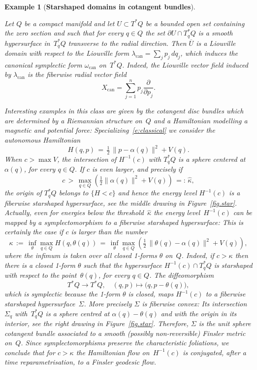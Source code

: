 \documentclass[12pt,twoside]{amsart}
\theoremstyle{plain}
\newtheorem{example}[theorem]{Example}
\numberwithin{figure}{section}
\numberwithin{equation}{section}
\def\can{\operatorname{can}}
\def\ga{\alpha}
\begin{document}
\begin{example}[\bf Starshaped domains in cotangent bundles]  \label{ex:spherisation}
{\rm 
Let $Q$ be a compact manifold and let $U \subset T^* Q$ be a bounded open set containing the zero section 
and such that for every $q \in Q$ the set $\partial U \cap T_q^* Q$ is a smooth hypersurface in~$T^*_q Q$ transverse to the radial direction. Then $\overline{U}$ is a Liouville domain with respect to the Liouville form $\lambda_{\can} = \sum_j p_j\, dq_j$, which induces the canonical symplectic 
form $\omega_{\can}$ on~$T^* Q$. 
Indeed, the Liouville vector field induced by $\lambda_{\can}$ is the fiberwise radial vector field
\[
X_{\can} = \sum_{j=1}^n p_j \frac{\partial}{\partial p_j}.
\]

Interesting examples in this class are given by the cotangent disc bundles which are determined by a Riemannian structure on~$Q$ and a Hamiltonian modelling a magnetic and potential force:
%
Specializing~\eqref{e:classical} we consider the autonomous Hamiltonian
\begin{equation} \label{e:AV}
H(q,p)  \,=\, \tfrac 12\, \| p-\ga (q) \|^2 + V(q) .
\end{equation}
When $c> \max V$, the intersection of $H^{-1}(c)$ with $T_q^*Q$ is a sphere centered 
at~$\ga (q)$, for every $q \in Q$. If $c$ is even larger, and precisely if
%
\begin{equation} \label{threshold}
c \,>\, \max_{q \in Q} \left( \tfrac 12 \| \ga (q) \|^2 + V(q)\right) \,=:\, \hat \kappa,
\end{equation}
the origin of $T_q^* Q$ belongs to $\{H<c\}$ and hence
the energy level $H^{-1}(c)$ is a fiberwise starshaped hypersurface,
see the middle drawing in Figure~\ref{fig.star}.
Actually, even for energies below the threshold~$\hat \kappa$ the energy level~$H^{-1}(c)$ can be mapped by a symplectomorphism to a 
fiberwise starshaped hypersurface: 
This is certainly the case if $c$ is larger than the number
\[
\kappa \,:=\, \inf_{\theta} \max_{q\in Q} H(q,\theta(q)) \,=\, \inf_{\theta} \max_{q \in Q} \left( \tfrac 12\, \| \theta(q) - \ga (q) \|^2 + V(q) \right) ,
\]
where the infimum is taken over all closed 1-forms $\theta$ on~$Q$. Indeed, if $c>\kappa$ then there is a closed 1-form $\theta$ such that the hypersurface $H^{-1}(c)\cap T_q^* Q$ is starshaped with respect to the point~$\theta(q)$, for every $q \in Q$. 
The diffeomorphism
\[
T^*Q \rightarrow T^* Q, \quad (q,p) \mapsto \bigl(q,p-\theta(q)\bigr),
\]
which is symplectic because the 1-form $\theta$ is closed, maps $H^{-1}(c)$ to a fiberwise 
starshaped hypersurface~$\Sigma$.
%
More precisely $\Sigma$ is fiberwise convex: Its intersection~$\Sigma_q$ with~$T^*_q Q$ is a sphere centred
at $\alpha(q)-\theta(q)$ and with the origin in its interior,
see the right drawing in Figure~\ref{fig.star}.
Therefore, $\Sigma$ is the unit sphere cotangent bundle associated to a smooth 
(possibly non-reversible) Finsler metric on~$Q$.
Since symplectomorphisms preserve the characteristic foliations, 
we conclude that for $c>\kappa$ the Hamiltonian flow on~$H^{-1}(c)$ is conjugated, 
after a time reparametrisation, to a Finsler geodesic flow.

}
\end{example}
\end{document}
